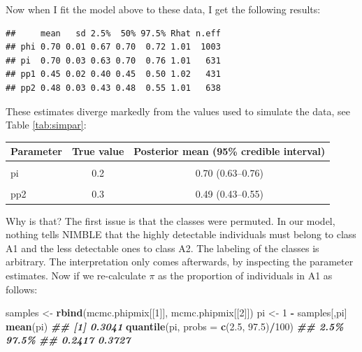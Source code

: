 \documentclass[
  12pt,
]{krantz}
\newenvironment{Shaded}{\begin{snugshade}}{\end{snugshade}}
\newcommand{\AttributeTok}[1]{\textcolor[rgb]{0.13,0.29,0.53}{#1}}
\newcommand{\DecValTok}[1]{\textcolor[rgb]{0.00,0.00,0.81}{#1}}
\newcommand{\DocumentationTok}[1]{\textcolor[rgb]{0.56,0.35,0.01}{\textbf{\textit{#1}}}}
\newcommand{\FloatTok}[1]{\textcolor[rgb]{0.00,0.00,0.81}{#1}}
\newcommand{\FunctionTok}[1]{\textcolor[rgb]{0.13,0.29,0.53}{\textbf{#1}}}
\newcommand{\NormalTok}[1]{#1}
\newcommand{\OtherTok}[1]{\textcolor[rgb]{0.56,0.35,0.01}{#1}}
\newcommand{\SpecialCharTok}[1]{\textcolor[rgb]{0.81,0.36,0.00}{\textbf{#1}}}
\newcommand{\StringTok}[1]{\textcolor[rgb]{0.31,0.60,0.02}{#1}}
\begin{document}
Now when I fit the model above to these data, I get the following results:

\begin{verbatim}
##     mean   sd 2.5%  50% 97.5% Rhat n.eff
## phi 0.70 0.01 0.67 0.70  0.72 1.01  1003
## pi  0.70 0.03 0.63 0.70  0.76 1.01   631
## pp1 0.45 0.02 0.40 0.45  0.50 1.02   431
## pp2 0.48 0.03 0.43 0.48  0.55 1.01   638
\end{verbatim}

These estimates diverge markedly from the values used to simulate the data, see Table \ref{tab:simpar}:

\begin{table}
\centering
\caption{\label{tab:simpar}Comparison of posterior estimates from NIMBLE with the data-generating values for a finite--mixture HMM.}
\centering
\begin{longtable}{lcc}
\toprule
Parameter & True value & Posterior mean (95\% credible interval)\\
\midrule
\cellcolor{gray!10}{phi} & \cellcolor{gray!10}{0.7} & \cellcolor{gray!10}{0.70 (0.67–0.73)}\\
pi & 0.2 & 0.70 (0.63–0.76)\\
\cellcolor{gray!10}{pp1} & \cellcolor{gray!10}{0.8} & \cellcolor{gray!10}{0.45 (0.40–0.49)}\\
pp2 & 0.3 & 0.49 (0.43–0.55)\\
\bottomrule
\end{longtable}
\end{table}

\justifying

Why is that? The first issue is that the classes were permuted. In our model, nothing tells NIMBLE that the highly detectable individuals must belong to class A1 and the less detectable ones to class A2. The labeling of the classes is arbitrary. The interpretation only comes afterwards, by inspecting the parameter estimates. Now if we re-calculate \(\pi\) as the proportion of individuals in A1 as follows:

\begin{Shaded}
\begin{Highlighting}[]
\NormalTok{samples }\OtherTok{\textless{}{-}} \FunctionTok{rbind}\NormalTok{(mcmc.phipmix[[}\DecValTok{1}\NormalTok{]], mcmc.phipmix[[}\DecValTok{2}\NormalTok{]])}
\NormalTok{pi }\OtherTok{\textless{}{-}} \DecValTok{1} \SpecialCharTok{{-}}\NormalTok{ samples[,}\StringTok{\textquotesingle{}pi\textquotesingle{}}\NormalTok{]}
\FunctionTok{mean}\NormalTok{(pi)}
\DocumentationTok{\#\# [1] 0.3041}
\FunctionTok{quantile}\NormalTok{(pi, }\AttributeTok{probs =} \FunctionTok{c}\NormalTok{(}\FloatTok{2.5}\NormalTok{, }\FloatTok{97.5}\NormalTok{)}\SpecialCharTok{/}\DecValTok{100}\NormalTok{)}
\DocumentationTok{\#\#   2.5\%  97.5\% }
\DocumentationTok{\#\# 0.2417 0.3727}
\end{Highlighting}
\end{Shaded}
\end{document}
